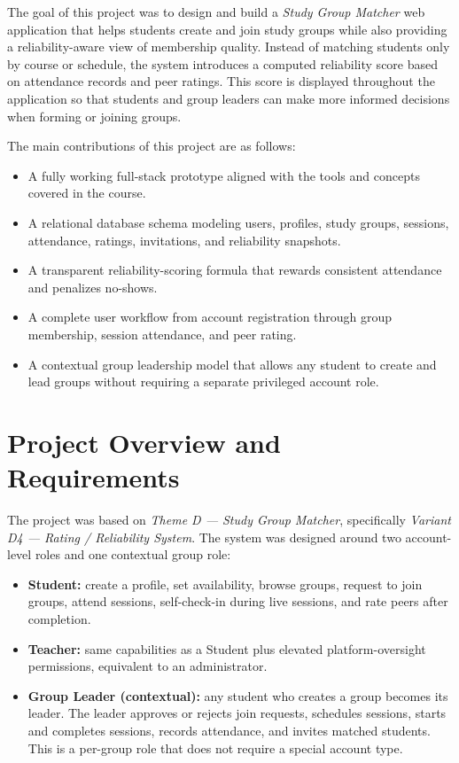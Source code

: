 \documentclass[conference]{IEEEtran}
\begin{document}
The goal of this project was to design and build a \textit{Study Group Matcher} web application that helps students create and join study groups while also providing a reliability-aware view of membership quality. Instead of matching students only by course or schedule, the system introduces a computed reliability score based on attendance records and peer ratings. This score is displayed throughout the application so that students and group leaders can make more informed decisions when forming or joining groups.

The main contributions of this project are as follows:
\begin{itemize}
    \item A fully working full-stack prototype aligned with the tools and concepts covered in the course.
    \item A relational database schema modeling users, profiles, study groups, sessions, attendance, ratings, invitations, and reliability snapshots.
    \item A transparent reliability-scoring formula that rewards consistent attendance and penalizes no-shows.
    \item A complete user workflow from account registration through group membership, session attendance, and peer rating.
    \item A contextual group leadership model that allows any student to create and lead groups without requiring a separate privileged account role.
\end{itemize}

\section{Project Overview and Requirements}
The project was based on \textit{Theme D --- Study Group Matcher}, specifically \textit{Variant D4 --- Rating / Reliability System}. The system was designed around two account-level roles and one contextual group role:

\begin{itemize}
    \item \textbf{Student:} create a profile, set availability, browse groups, request to join groups, attend sessions, self-check-in during live sessions, and rate peers after completion.
    \item \textbf{Teacher:} same capabilities as a Student plus elevated platform-oversight permissions, equivalent to an administrator.
    \item \textbf{Group Leader (contextual):} any student who creates a group becomes its leader. The leader approves or rejects join requests, schedules sessions, starts and completes sessions, records attendance, and invites matched students. This is a per-group role that does not require a special account type.
\end{itemize}
\end{document}
